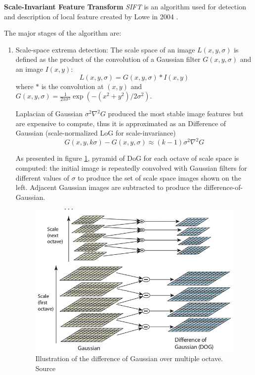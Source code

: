 \textbf{Scale-Invariant Feature Transform} \textit{SIFT} is an algorithm used for detection and description of local feature created by Lowe in 2004 \cite{Lowe2004}.

The major stages of the algorithm are:
\begin{enumerate}
    \item Scale-space extrema detection: The scale space of an image $L(x, y, \sigma)$ is defined as the product of the convolution of a Gaussian filter $G(x, y, \sigma)$ and an image $I(x, y)$:
    $$
    L(x, y, \sigma) = G(x, y, \sigma) * I(x, y)
    $$
    where $*$ is the convolution at $(x, y)$ and $G(x, y, \sigma) = \frac{1}{2 \pi \sigma^2} \exp(-(x^2 + y^2) / 2 \sigma^2)$.
    
    Laplacian of Gaussian $\sigma^2 \nabla^2 G$ produced the most stable image features but are expensive to compute, thus it is approximated as an Difference of Gaussian (scale-normalized LoG for scale-invariance)
    $$
    G(x, y, k \sigma) - G(x, y, \sigma) \approx (k - 1) \sigma^2 \nabla^2 G
    $$
    
    As presented in figure \ref{fig:sift_difference_of_gaussian}, pyramid of DoG for each octave of scale space is computed: the initial image is repeatedly convolved with Gaussian filters for different values of $\sigma$ to produce the set of scale space images shown on the left. Adjacent Gaussian images are subtracted to produce the difference-of-Gaussian.
    
    \begin{figure}[h]
        \centering
        \includegraphics[scale=0.5]{img/sift_difference_of_gaussian.png}
        \caption[Illustration of the difference of Gaussian over multiple octave]{Illustration of the difference of Gaussian over multiple octave. Source \cite{Lowe2004}}
        \label{fig:sift_difference_of_gaussian}
    \end{figure}
    

\end{enumerate}

